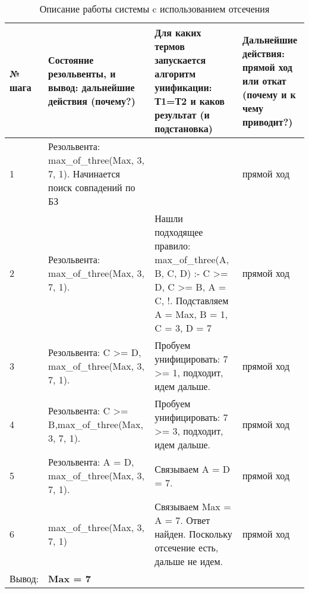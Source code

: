 \begin{table}
	\caption{Описание работы системы c использованием отсечения}
	\begin{tabular}{|p{1cm}|p{5cm}|p{5cm}|p{5cm}|}
		\hline
		№ шага & Состояние резольвенты, и вывод: дальнейшие действия (почему?) & Для каких термов запускается алгоритм унификации: Т1=Т2 и каков результат (и подстановка) & Дальнейшие действия: прямой ход или откат (почему и к чему приводит?) \\
		\hline
		1 & Резольвента: max\_of\_three(Max, 3, 7, 1). Начинается поиск совпадений по БЗ &  & прямой ход \\
		\hline
		2 & Резольвента: max\_of\_three(Max, 3, 7, 1). & Нашли подходящее правило: max\_of\_three(A, B, C, D) :- C >= D, C >= B, A = C, !. Подставляем A = Max, B = 1, C = 3, D = 7 & прямой ход \\
		\hline
		3 & Резольвента: C >= D, \newline max\_of\_three(Max, 3, 7, 1). & Пробуем унифицировать: 7 >= 1, подходит, идем дальше.   & прямой ход \\
		\hline
		4 & Резольвента: C >= B,\newline max\_of\_three(Max, 3, 7, 1). & Пробуем унифицировать: 7 >= 3, подходит, идем дальше. & прямой ход \\
		\hline
		5 & Резольвента: A = D, \newline max\_of\_three(Max, 3, 7, 1). & Связываем A = D = 7.  & прямой ход \\
		\hline
		6 & max\_of\_three(Max, 3, 7, 1) & Связываем Max = A = 7. Ответ найден. Поскольку отсечение есть, дальше не идем. & прямой ход \\
		\hline
		Вывод: & \textbf{Max = 7} &  &  \\
		\hline
	\end{tabular}
\end{table}